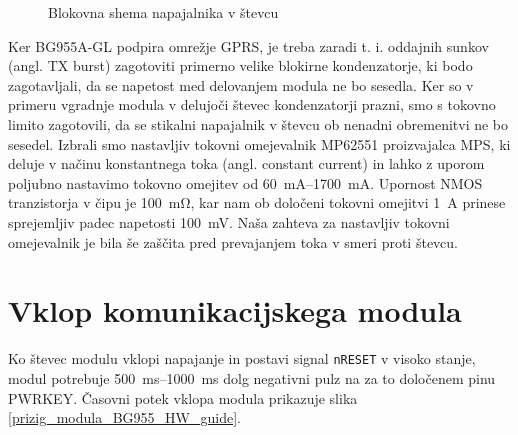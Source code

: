 \documentclass[a4paper,twoside,openright,12pt,slovene]{book}
\begin{document}
\begin{figure}[htbp]
    \centering
    
    \caption{Blokovna shema napajalnika v števcu}
    \label{blok_shema_napajanje_stevec}
\end{figure}

Ker BG955A-GL podpira omrežje GPRS, je treba zaradi t. i. oddajnih sunkov (angl. TX burst) zagotoviti primerno velike blokirne kondenzatorje, ki bodo zagotavljali, da se napetost med delovanjem modula ne bo sesedla. Ker so v primeru vgradnje modula v delujoči števec kondenzatorji prazni, smo s tokovno limito zagotovili, da se stikalni napajalnik v števcu ob nenadni obremenitvi ne bo sesedel. Izbrali smo nastavljiv tokovni omejevalnik MP62551 proizvajalca MPS, ki deluje v načinu konstantnega toka (angl. constant current) in lahko z uporom poljubno nastavimo tokovno omejitev od \SIrange{60}{1700}{\milli\ampere}. Upornost NMOS tranzistorja v čipu je \SI{100}{\milli\ohm}, kar nam ob določeni tokovni omejitvi \SI{1}{\ampere} prinese sprejemljiv padec napetosti \SI{100}{\milli\volt}. Naša zahteva za nastavljiv tokovni omejevalnik je bila še zaščita pred prevajanjem toka v smeri proti števcu.

\section{Vklop komunikacijskega modula}
Ko števec modulu vklopi napajanje in postavi signal \texttt{nRESET} v visoko stanje, modul potrebuje \SIrange{500}{1000}{\milli\second} dolg negativni pulz na za to določenem pinu PWRKEY. Časovni potek vklopa modula prikazuje slika \ref{prizig_modula_BG955_HW_guide}.
\end{document}
